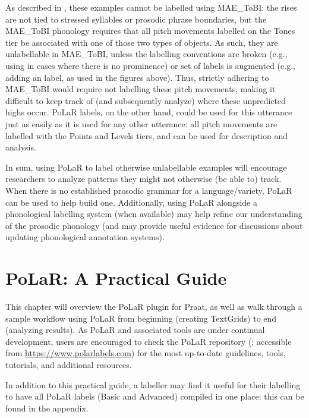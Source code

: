 \documentclass[11pt, twoside]{memoir}
\def\polar#1{{\relsize{-.5}\fontspec[Mapping=tex-text]{Roboto Mono}{#1}}}
\def\tobi#1{\polar{#1}}
\begin{document}
As described in \citealt{ahnzhou19}, these examples cannot be labelled using MAE\_ToBI: the rises are not tied to stressed syllables or prosodic phrase boundaries, but the MAE\_ToBI phonology requires that all pitch movements labelled on the Tones tier be associated with one of those two types of objects. As such, they are unlabellable in MAE\_ToBI, unless the labelling conventions are broken (e.g., using \tobi{H*} in cases where there is no prominence) or set of labels is augmented (e.g., adding an \tobi{h} label, as used in the figures above). Thus, strictly adhering to MAE\_ToBI would require not labelling these pitch movements, making it difficult to keep track of (and subsequently analyze) where these unpredicted highs occur. PoLaR labels, on the other hand, could be used for this utterance just as easily as it is used for any other utterance: all pitch movements are labelled with the Points and Levels tiers, and can be used for description and analysis.

In sum, using PoLaR to label otherwise unlabellable examples will encourage researchers to analyze patterns they might not otherwise (be able to) track. When there is no established prosodic grammar for a language\slash variety, PoLaR can be used to help build one. Additionally, using PoLaR alongside a phonological labelling system (when available) may help refine our understanding of the prosodic phonology (and may provide useful evidence for discussions about updating phonological annotation systems).







\chapter{PoLaR: A Practical Guide}\label{ch:practical}

This chapter will overview the PoLaR plugin for Praat, as well as walk through a sample workflow using PoLaR from beginning (creating TextGrids) to end (analyzing results). As PoLaR and associated tools are under continual development, users are encouraged to check the PoLaR repository (\citealt{ahn-21}; accessible from \href{https://www.polarlabels.com}{https://www.polarlabels.com}) for the most up-to-date guidelines, tools, tutorials, and additional resources.

In addition to this practical guide, a labeller may find it useful for their labelling to have all PoLaR labels (Basic and Advanced) compiled in one place: this can be found in the appendix.
\end{document}
